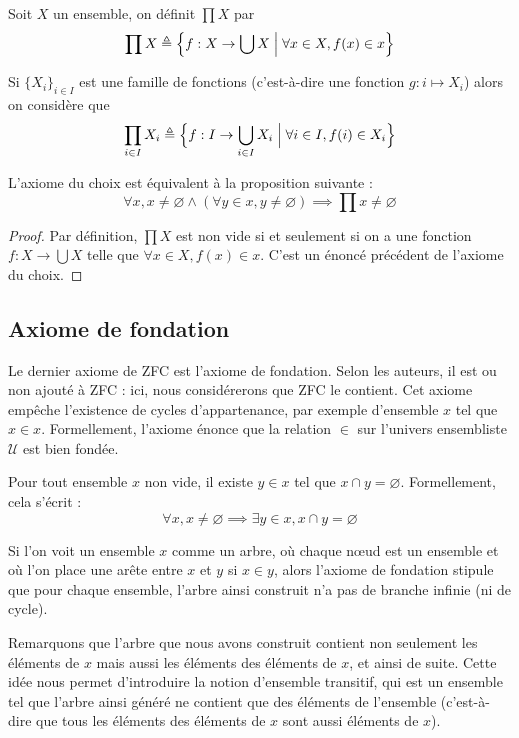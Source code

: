 \begin{definition}
  Soit $X$ un ensemble, on définit $\prod X$ par
  \[\prod X \triangleq \Big\{f : X \to \bigcup X \;\Big|\; \forall x \in X, f(x)\in
  x\Big\}\]

  Si $\{X_i\}_{i\in I}$ est une famille de fonctions (c'est-à-dire une fonction
  $g : i \mapsto X_i$) alors on considère que
  \[\prod_{i\in I} X_i \triangleq \Big\{ f : I \to \bigcup_{i\in I} X_i\;\Big|\;
  \forall i \in I, f(i) \in X_i\Big\}\]
\end{definition}

\begin{proposition}
  L'axiome du choix est équivalent à la proposition suivante :
  \[\forall x, x\neq \varnothing \land (\forall y \in x, y \neq \varnothing)
  \implies \prod x \neq \varnothing\]
\end{proposition}

\begin{proof}
  Par définition, $\prod X$ est non vide si et seulement si on a une fonction
  $f : X \to \bigcup X$ telle que $\forall x \in X, f(x)\in x$. C'est un énoncé
  précédent de l'axiome du choix.
\end{proof}

\subsection{Axiome de fondation}

Le dernier axiome de ZFC est l'axiome de fondation. Selon les auteurs, il est ou
non ajouté à ZFC : ici, nous considérerons que ZFC le contient. Cet axiome
empêche l'existence de cycles d'appartenance, par exemple d'ensemble $x$ tel que
$x\in x$. Formellement, l'axiome énonce que la relation $\in$ sur l'univers
ensembliste $\mathcal U$ est bien fondée.

\begin{axiom}[Fondation]\label{ax.ZF.AF}
  Pour tout ensemble $x$ non vide, il existe $y\in x$ tel que
  $x\cap y = \varnothing$. Formellement, cela s'écrit :
  \[\forall x, x\neq\varnothing \implies \exists y \in x, x\cap y =
  \varnothing\]
\end{axiom}

Si l'on voit un ensemble $x$ comme un arbre, où chaque n\oe ud est un ensemble
et où l'on place une arête entre $x$ et $y$ si $x\in y$, alors l'axiome de
fondation stipule que pour chaque ensemble, l'arbre ainsi construit n'a pas de
branche infinie (ni de cycle).

Remarquons que l'arbre que nous avons construit contient non seulement les
éléments de $x$ mais aussi les éléments des éléments de $x$, et ainsi de suite.
Cette idée nous permet d'introduire la notion d'ensemble transitif, qui est un
ensemble tel que l'arbre ainsi généré ne contient que des éléments de l'ensemble
(c'est-à-dire que tous les éléments des éléments de $x$ sont aussi éléments de
$x$).

